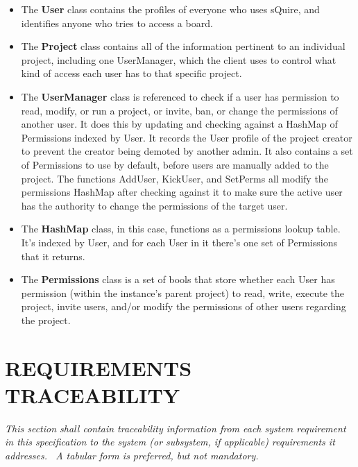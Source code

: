 \documentclass[twoside,letterpaper]{article}
\begin{document}
{\begin{itemize}
	\item The \textbf{User} class contains the profiles of everyone who uses sQuire, and identifies anyone who tries to access a board.
	\item The \textbf{Project} class contains all of the information pertinent to an individual project, including one UserManager, which the client uses to control what kind of access each user has to that specific project.
	\item The \textbf{UserManager} class is referenced to check if a user has permission to read, modify, or run a project, or invite, ban, or change the permissions of another user. It does this by updating and checking against a HashMap of Permissions indexed by User. It records the User profile of the project creator to prevent the creator being demoted by another admin. It also contains a set of Permissions to use by default, before users are manually added to the project.
	The functions AddUser, KickUser, and SetPerms all modify the permissions HashMap after checking against it to make sure the active user has the authority to change the permissions of the target user.
	\item The \textbf{HashMap} class, in this case, functions as a permissions lookup table. It's indexed by User, and for each User in it there's one set of Permissions that it returns.
	\item The \textbf{Permissions} class is a set of bools that store whether each User has permission (within the instance's parent project) to read, write, execute the project, invite users, and/or modify the permissions of other users regarding the project.
\end{itemize}

\newpage

\subparagraph[]{\rmfamily\color{black} }
\clearpage\setcounter{page}{1}\pagestyle{Convertvi}
\section[REQUIREMENTS TRACEABILITY]{\rmfamily\bfseries\color{black} REQUIREMENTS TRACEABILITY}
\hypertarget{RefHeading28459017292}{}{\itshape\color{black}
This section shall contain traceability information from each system requirement in this specification to the system (or
subsystem, if applicable) requirements it addresses. \ A tabular form is preferred, but not mandatory.}


\bigskip


}
\end{document}
